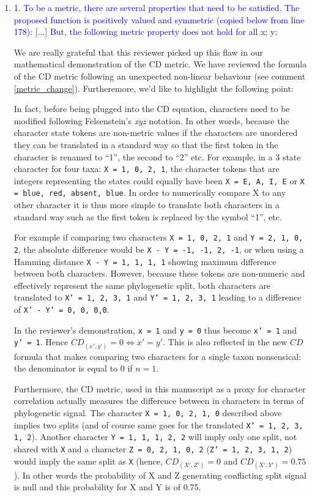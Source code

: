 \documentclass[12pt,letterpaper]{article}
\begin{document}
\begin{enumerate}

\item{\textcolor{blue}{1. To be a metric, there are several properties that need to be satisfied. The proposed function
is positively valued and symmetric (copied below from line 178): [...] But, the following metric property does not hold for all x; y:}}
\label{proof}

We are really grateful that this reviewer picked up this flaw in our mathematical demonstration of the CD metric.
We have reviewed the formula of the CD metric following an unexpected non-linear behaviour (see comment \ref{metric_change}).
Furtheremore, we'd like to highlight the following point:

In fact, before being plugged into the CD equation, characters need to be modified following Felsenstein's \textit{xyz} notation.
In other words, because the character state tokens are non-metric values if the characters are unordered they can be translated in a standard way so that the first token in the character is renamed to ``1'', the second to ``2'' etc.
For example, in a 3 state character for four taxa: \texttt{X = {1, 0, 2, 1}}, the character tokens that are integers representing the states could equally have been \texttt{X = {E, A, I, E}} or \texttt{X = {blue, red, absent, blue}}.
In order to numerically compare X to any other character it is thus more simple to translate both characters in a standard way such as the first token is replaced by the symbol ``1'', etc.

For example if comparing two characters \texttt{X = {1, 0, 2, 1}} and \texttt{Y = {2, 1, 0, 2}}, the absolute difference would be \texttt{X - Y = {-1, -1, 2, -1}}, or when using a Hamming distance \texttt{X - Y = {1, 1, 1, 1}} showing maximum difference between both characters.
However, because these tokens are non-numeric and effectively represent the same phylogenetic split, both characters are translated to \texttt{X' = {1, 2, 3, 1}} and \texttt{Y' = {1, 2, 3, 1}} leading to a difference of \texttt{X' - Y' = {0, 0, 0,0}}.

In the reviewer's demonstration, \texttt{x  = {1}} and \texttt{y  = {0}} thus become \texttt{x' = {1}} and \texttt{y' = {1}}.
Hence $CD_{(x',y')} = 0 \Leftrightarrow x' = y'$.
This is also reflected in the new $CD$ formula that makes comparing two characters for a single taxon nonsensical: the denominator is equal to $0$ if $n = 1$.

Furthermore, the CD metric, used in this manuscript as a proxy for character correlation actually measures the difference between in characters in terms of phylogenetic signal.
The character \texttt{X = {1, 0, 2, 1, 0}} described above implies two splits (and of course same goes for the translated \texttt{X' = {1, 2, 3, 1, 2}}).
Another character \texttt{Y = {1, 1, 1, 2, 2}} will imply only one split, not shared with \texttt{X} and a character \texttt{Z = {0, 2, 1, 0, 2}} (\texttt{Z' = {1, 2, 3, 1, 2}}) would imply the same split as \texttt{X} (hence, $CD_{(X',Z')} = 0$ and $CD_{(X',Y')} = 0.75$).
In other words the probability of X and Z generating conflicting split signal is null and this probability for X and Y is of 0.75.


\end{enumerate}
\end{document}
